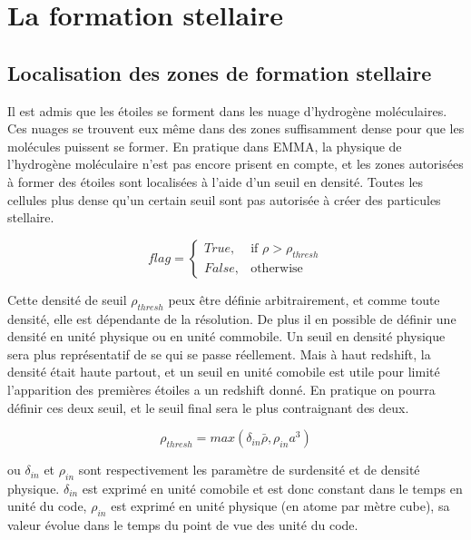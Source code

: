 \clearpage
\section{La formation stellaire}

\subsection{Localisation des zones de formation stellaire}

Il est admis que les étoiles se forment dans les nuage d'hydrogène moléculaires. %
Ces nuages se trouvent eux même dans des zones suffisamment dense pour que les molécules puissent se former.
En pratique dans EMMA, la physique de l'hydrogène moléculaire n'est pas encore prisent en compte, et les zones autorisées à former des étoiles sont localisées à l'aide d'un seuil en densité.
Toutes les cellules plus dense qu'un certain seuil sont pas autorisée à créer des particules stellaire.

\begin{equation}
	flag = 
  \begin{cases}
      True, & \text{if } \rho > \rho_{thresh}\\
      False,              & \text{otherwise}
  \end{cases}
\end{equation} 

Cette densité de seuil $\rho_{thresh}$ peux être définie arbitrairement, et comme toute densité, elle est dépendante de la résolution.
De plus il en possible de définir une densité en unité physique ou en unité commobile.
Un seuil en densité physique sera plus représentatif de se qui se passe réellement.
Mais à haut redshift, la densité était haute partout, et un seuil en unité comobile est utile pour limité l'apparition des premières étoiles a un redshift donné.
En pratique on pourra définir ces deux seuil, et le seuil final sera le plus contraignant des deux.


\begin{equation}
	\rho_{thresh} = max\left(  \delta_{in} \bar{\rho}, \rho_{in} a^3 \right)
\end{equation} 

ou $\delta_{in}$ et $\rho_{in}$  sont respectivement les paramètre de surdensité et de densité physique.
$\delta_{in}$ est exprimé en unité comobile et est donc constant dans le temps en unité du code,
 $\rho_{in}$ est exprimé en unité physique (en atome par mètre cube), sa valeur évolue dans le temps du point de vue des unité du code.

